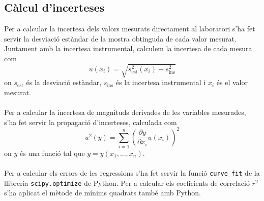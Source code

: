 \documentclass[12pt,twosides,onecolumn,openany]{article}
\begin{document}
\begin{multicols}{2}
\subsection{Càlcul d'incerteses}
Per a calcular la incertesa dels valors mesurats directament al laboratori s'ha fet servir la desviació estàndar de la mostra obtinguda de cada valor mesurat. Juntament amb la incertesa instrumental, calculem la incertesa de cada mesura com
    \begin{equation*}
        u(x_i) = \sqrt{ s_{\text{est}}^2(x_i) + s_{\text{ins}}^2}
    \end{equation*}
    on $s_{\text{est}}$ és la desviació estàndar, $s_{\text{ins}}$ és la incertesa instrumental i $x_i$ és el valor mesurat.\\\\
    Per a calcular la incertesa de magnituds derivades de les variables mesurades, s'ha fet servir la propagació d'incerteses, calculada com
    \begin{equation*}
        u^2(y) = \sum_{i = 1}^{n} \left( \frac{\partial y}{\partial{x_i}} u(x_i)\right)^2
    \end{equation*}
    on $y$ és una funció tal que $y = y(x_1,...,x_n)$.\\\\
    Per a calcular els errors de les regressions s'ha fet servir la funció \texttt{curve\_fit} de la llibreria \texttt{scipy.optimize} de Python. Per a calcular els coeficients de correlació $r^2$ s'ha aplicat el mètode de mínims quadrats també amb Python.

\end{multicols}
\end{document}
